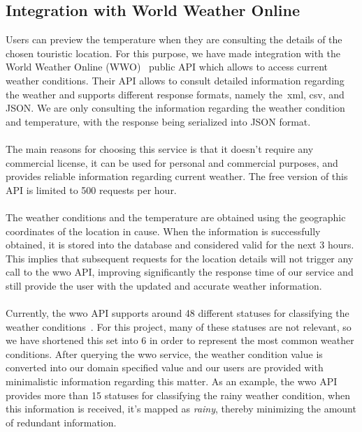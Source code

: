 \subsection{Integration with World Weather Online}
\label{subsec:integrationWWO}
Users can preview the temperature when they are consulting the details of the chosen touristic location. For this purpose, we have made integration with the World Weather Online (WWO)~\cite{wwo} public API which allows to access current weather conditions. Their API allows to consult detailed information regarding the weather and supports different response formats, namely the~\gls{xml}, \gls{csv}, and JSON. We are only consulting the information regarding the weather condition and temperature, with the response being serialized into JSON format.\\
\\
The main reasons for choosing this service is that it doesn't require any commercial license, it can be used for personal and commercial purposes, and provides reliable information regarding current weather. The free version of this API is limited to 500 requests per hour.\\
\\
The weather conditions and the temperature are obtained using the geographic coordinates of the location in cause. When the information is successfully obtained, it is stored into the database and considered valid for the next 3 hours. This implies that subsequent requests for the location details will not trigger any call to the \gls{wwo} API, improving significantly the response time of our service and still provide the user with the updated and accurate weather information.\\
\\
Currently, the \gls{wwo} API supports around 48 different statuses for classifying the weather conditions~\cite{wwoCodes}. For this project, many of these statuses are not relevant, so we have shortened this set into 6 in order to represent the most common weather conditions. After querying the \gls{wwo} service, the weather condition value is converted into our domain specified value and our users are provided with minimalistic information regarding this matter. As an example, the \gls{wwo} API provides more than 15 statuses for classifying the rainy weather condition, when this information is received, it's mapped as \emph{rainy}, thereby minimizing the amount of redundant information. 

